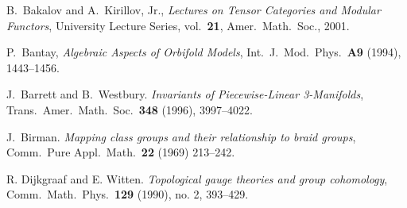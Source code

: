 \documentclass{amsart}
\begin{document}
\begin{thebibliography}{9999}



 B.\ Bakalov and A.\ Kirillov, Jr., {\em Lectures on
Tensor Categories and Modular Functors}, University Lecture Series,
vol.\ {\bf 21},  Amer.\ Math.\ Soc., 2001.

 P.\ Bantay, \emph{Algebraic Aspects of Orbifold Models}, Int.\ J.\ Mod.\ Phys.\ \textbf{A9} (1994), 1443--1456.

 J.\ Barrett and B.\ Westbury. {\em Invariants
of Piecewise-Linear 3-Manifolds}, Trans.\ Amer.\ Math.\ Soc.\ \textbf{348} (1996), 3997--4022.

 J.\ Birman. \emph{Mapping class groups and their relationship to braid groups}, Comm.\ Pure Appl.\ Math.\ \textbf{22} (1969) 213--242.





 R. Dijkgraaf and E. Witten. \emph{Topological gauge theories and group cohomology}, Comm.\ Math.\ Phys.\ \textbf{129} (1990), no. 2, 393--429.




\end{thebibliography}
\end{document}
